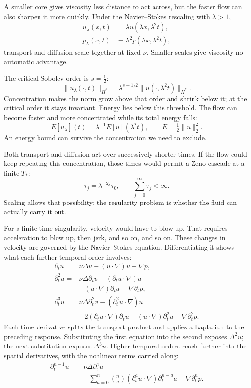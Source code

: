 A smaller core gives viscosity less distance to act across, but the faster
flow can also sharpen it more quickly. Under the Navier--Stokes rescaling
with \(\lambda>1\),
\[
 \begin{aligned}
 u_\lambda(x,t)&=\lambda u(\lambda x,\lambda^2t),\\
 p_\lambda(x,t)&=\lambda^2p(\lambda x,\lambda^2t),
 \end{aligned}
\]
transport and diffusion scale together at fixed \(\nu\). Smaller scales give
viscosity no automatic advantage.

The critical Sobolev order is \(s=\tfrac12\):
\[
 \|u_\lambda(\cdot,t)\|_{\dot H^s}
 =\lambda^{s-1/2}\|u(\cdot,\lambda^2t)\|_{\dot H^s}.
\]
Concentration makes the norm grow above that order and shrink below it;
at the critical order it stays invariant. Energy lies below this threshold.
The flow can become faster and more concentrated while its total energy
falls:
\[
 E[u_\lambda](t)=\lambda^{-1}E[u](\lambda^2t),
 \qquad E=\tfrac12\|u\|_2^2.
\]
An energy bound can survive the concentration we need to exclude.

Both transport and diffusion act over successively shorter times. If the
flow could keep repeating this concentration, those times would permit a
Zeno cascade at a finite \(T_*\):
\[
 \tau_j=\lambda^{-2j}\tau_0,
 \qquad \sum_{j=0}^{\infty}\tau_j<\infty.
\]
Scaling allows that possibility; the regularity
problem is whether the fluid can actually carry it out.

For a finite-time singularity, velocity would have to blow up. That requires
acceleration to blow up, then jerk, and so on, and so on. These changes in
velocity are governed by the Navier--Stokes equation. Differentiating it
shows what each further temporal order involves:
\[
 \begin{aligned}
 \partial_tu={}&\nu\Delta u-(u\cdot\nabla)u-\nabla p,\\
 \partial_t^2u={}&\nu\Delta\partial_tu
 -(\partial_tu\cdot\nabla)u\\
 &-(u\cdot\nabla)\partial_tu-\nabla\partial_tp,\\
 \partial_t^3u={}&\nu\Delta\partial_t^2u
 -(\partial_t^2u\cdot\nabla)u\\
 &-2(\partial_tu\cdot\nabla)\partial_tu
 -(u\cdot\nabla)\partial_t^2u
 -\nabla\partial_t^2p.
 \end{aligned}
\]
Each time derivative splits the transport product and applies a Laplacian
to the preceding response. Substituting the first equation into the second
exposes \(\Delta^2u\); the next substitution exposes \(\Delta^3u\).
Higher temporal orders reach further into the spatial derivatives, with
the nonlinear terms carried along:
\[
 \begin{aligned}
 \partial_t^{n+1}u={}&\nu\Delta\partial_t^nu\\
 &-\sum_{a=0}^{n}\binom na
 (\partial_t^au\cdot\nabla)\partial_t^{n-a}u
 -\nabla\partial_t^np.
 \end{aligned}
\]

